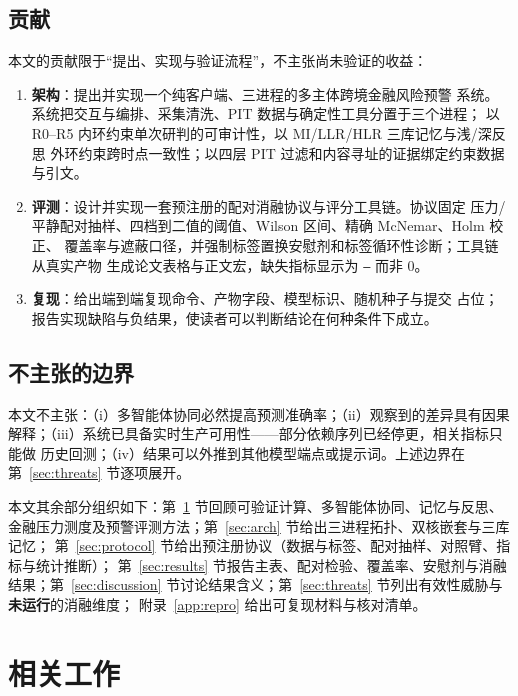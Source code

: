 \documentclass[UTF8,fontset=fandol,11pt,a4paper]{ctexart}
\begin{document}
\subsection{贡献}

本文的贡献限于“提出、实现与验证流程”，不主张尚未验证的收益：
\begin{enumerate}
  \item \textbf{架构}：提出并实现一个纯客户端、三进程的多主体跨境金融风险预警
        系统。系统把交互与编排、采集清洗、PIT 数据与确定性工具分置于三个进程；
        以 R0--R5 内环约束单次研判的可审计性，以 MI/LLR/HLR 三库记忆与浅/深反思
        外环约束跨时点一致性；以四层 PIT 过滤和内容寻址的证据绑定约束数据与引文。
  \item \textbf{评测}：设计并实现一套预注册的配对消融协议与评分工具链。协议固定
        压力/平静配对抽样、四档到二值的阈值、Wilson 区间、精确 McNemar、Holm 校正、
        覆盖率与遮蔽口径，并强制标签置换安慰剂和标签循环性诊断；工具链从真实产物
        生成论文表格与正文宏，缺失指标显示为 \texttt{--} 而非 0。
  \item \textbf{复现}：给出端到端复现命令、产物字段、模型标识、随机种子与提交
        占位；报告实现缺陷与负结果，使读者可以判断结论在何种条件下成立。
\end{enumerate}

\subsection{不主张的边界}

本文不主张：（i）多智能体协同必然提高预测准确率；（ii）观察到的差异具有因果
解释；（iii）系统已具备实时生产可用性——部分依赖序列已经停更，相关指标只能做
历史回测；（iv）结果可以外推到其他模型端点或提示词。上述边界在
第~\ref{sec:threats} 节逐项展开。

本文其余部分组织如下：第~\ref{sec:related} 节回顾可验证计算、多智能体协同、记忆与反思、
金融压力测度及预警评测方法；第~\ref{sec:arch} 节给出三进程拓扑、双核嵌套与三库记忆；
第~\ref{sec:protocol} 节给出预注册协议（数据与标签、配对抽样、对照臂、指标与统计推断）；
第~\ref{sec:results} 节报告主表、配对检验、覆盖率、安慰剂与消融结果；第~\ref{sec:discussion}
节讨论结果含义；第~\ref{sec:threats} 节列出有效性威胁与\textbf{未运行}的消融维度；
附录~\ref{app:repro} 给出可复现材料与核对清单。

\section{相关工作}
\label{sec:related}
\end{document}
